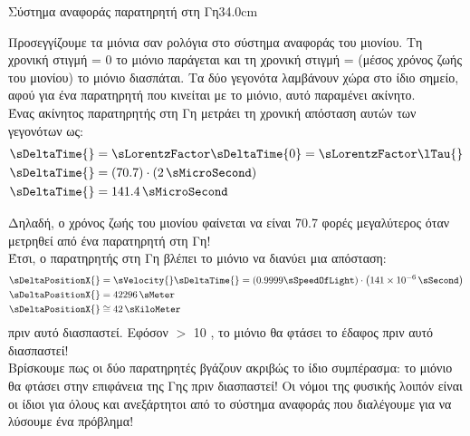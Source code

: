 \begin{MyColumnRight}[detach title,before upper={\tcbtitle\quad}]{Σύστημα αναφοράς παρατηρητή στη Γη}{34.0cm}

Προσεγγίζουμε τα μιόνια σαν ρολόγια στο σύστημα αναφοράς του μιονίου.
Τη χρονική στιγμή \sTime{} = 0 το μιόνιο παράγεται και τη χρονική
στιγμή \sTime{} = \lTau{} (μέσος χρόνος ζωής του μιονίου) το μιόνιο διασπάται. 
Τα δύο γεγονότα  λαμβάνουν χώρα στο ίδιο σημείο, αφού για ένα
παρατηρητή που κινείται με το μιόνιο, αυτό παραμένει ακίνητο.\\

Ένας ακίνητος παρατηρητής στη Γη μετράει τη χρονική απόσταση αυτών των γεγονότων ως: 
\en
\begin{align*}
\sDeltaTime{} &= \sLorentzFactor \sDeltaTime{0} = \sLorentzFactor \lTau{} \\
\sDeltaTime{} &= \left(70.7\right) \cdot  \left(2 \,\sMicroSecond\right) \\
\sDeltaTime{} &= 141.4 \,\sMicroSecond
\end{align*}
\gr

Δηλαδή, ο χρόνος ζωής του μιονίου φαίνεται να είναι 70.7 φορές
μεγαλύτερος όταν μετρηθεί από ένα παρατηρητή στη Γη!\\

Έτσι, ο παρατηρητής στη Γη βλέπει το μιόνιο να διανύει μια απόσταση:
\en
\begin{align*}
\sDeltaPositionX{} & = \sVelocity{} \sDeltaTime{} = \left(0.9999 \sSpeedOfLight\right) \cdot \left(141 \times 10^{-6} \,\sSecond\right) \\
\sDeltaPositionX{}  &= 42296 \,\sMeter \\
\sDeltaPositionX{}  &\cong 42 \,\sKiloMeter
\end{align*}
\gr
πριν αυτό διασπαστεί. Εφόσον  \sKiloMeter $>$ 10 \sKiloMeter\gr, το μιόνιο θα φτάσει το έδαφος πριν αυτό διασπαστεί!\\

Βρίσκουμε πως οι δύο παρατηρητές βγάζουν ακριβώς το ίδιο συμπέρασμα:
το μιόνιο θα φτάσει στην επιφάνεια της Γης πριν διασπαστεί!
Oι νόμοι της φυσικής λοιπόν είναι οι ίδιοι για όλους και ανεξάρτητοι από το σύστημα αναφοράς
που διαλέγουμε για να λύσουμε ένα πρόβλημα!

\end{MyColumnRight}
